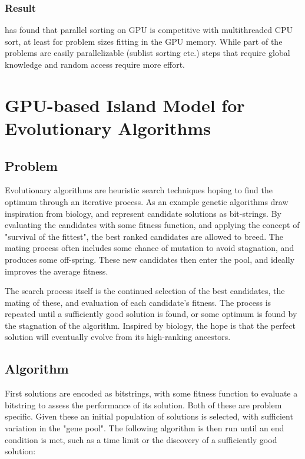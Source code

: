 \documentclass[twocolumn]{article} %
\begin{document}
		\subsubsection*{Result}
			\cite{satish09} has found that parallel sorting on GPU is competitive with multithreaded CPU sort, at least for problem
			sizes fitting in the GPU memory. While part of the problems are easily parallelizable (sublist sorting etc.) steps
			that require global knowledge and random access require more effort.

\section*{GPU-based Island Model for Evolutionary Algorithms}
	\subsection*{Problem}
		Evolutionary algorithms are heuristic search techniques hoping to find the optimum through an iterative process. As an
		example genetic algorithms draw inspiration from biology, and represent candidate solutions as bit-strings. By
		evaluating the candidates with some fitness function, and applying the concept of "survival of the fittest", the best
		ranked candidates are allowed to breed. The mating process often includes some chance of mutation to avoid stagnation,
		and produces some off-spring. These new candidates then enter the pool, and ideally improves the average fitness.
		
		The search process itself is the continued selection of the best candidates, the mating of these, and evaluation of 
		each candidate's fitness. The process is repeated until a sufficiently good solution is found, or some optimum is found
		by the stagnation of the algorithm. Inspired by biology, the hope is that the perfect solution will eventually evolve
		from its high-ranking ancestors.
		
	\subsection*{Algorithm}
		First solutions are encoded as bitstrings, with some fitness function to evaluate a bitstring to assess the performance
		of its solution. Both of these are problem specific. Given these an initial population of solutions is selected, with
		sufficient variation in the "gene pool". The following algorithm is then run until an end condition is met, such as a
		time limit or the discovery of a sufficiently good solution:
		
\end{document}
